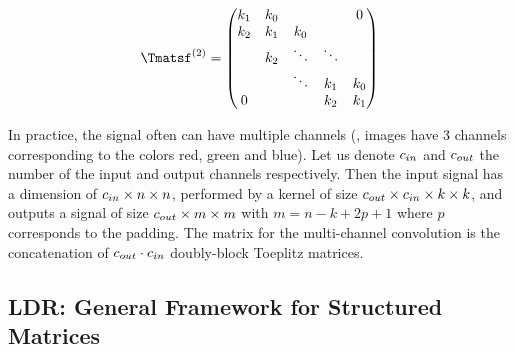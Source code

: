 \begin{equation*}
  \Tmatsf^{(2)} = \leftmatrix
    k_1 & k_0 &         &         & 0       \\
    k_2 & k_1 & k_0 &         &         \\
            & k_2 & \ddots  & \ddots  &         \\
            &         & \ddots  & k_1 & k_0 \\
    0       &         &         & k_2 & k_1 \\
  \rightmatrix
\end{equation*}


In practice, the signal often can have multiple channels (\eg, images have 3 channels corresponding to the colors red, green and blue).
Let us denote $c_{in}$ and $c_{out}$ the number of the input and output channels respectively.
Then the input signal has a dimension of $c_{in} \times n \times n$, performed by a kernel of size $c_{out} \times c_{in} \times k \times k$, and outputs a signal of size $c_{out} \times m \times m$ with $m = n - k + 2p + 1$ where $p$ corresponds to the padding.
The matrix for the multi-channel convolution is the concatenation of $c_{out} \cdot c_{in}$ doubly-block Toeplitz matrices.



\subsection{LDR: General Framework for Structured Matrices}
\label{subsection:ch2-general_frameworks_for_structured_matrices}


